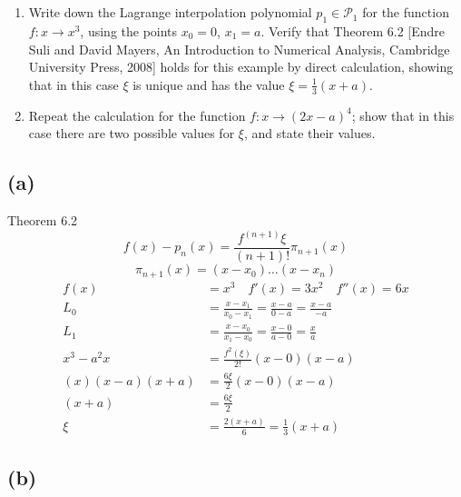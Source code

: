 \documentclass{article}
\begin{document}
\section{}
\begin{enumerate}[label = (\alph*)]
    \item Write down the Lagrange interpolation polynomial $p_1 \in \mathcal{P}_1$ for the function $f:x \to x^3$, using the points $x_0 = 0$, $x_1 = a$. Verify that Theorem 6.2 [Endre Suli and David Mayers, An Introduction to Numerical Analysis, Cambridge University Press, 2008] holds for this example by direct calculation, showing that in this case $\xi$ is unique and has the value $\xi=\frac{1}{3}(x+a)$.
    \item Repeat the calculation for the function $f: x \to (2x-a)^4$; show that in this case there are two possible values for $\xi$, and state their values.
\end{enumerate}
\vspace{10mm}

\subsection*{(a)}
Theorem 6.2
\begin{equation}\label{thm:6.2a}
    f(x) - p_n(x) = \frac{f^{(n+1)}\xi}{(n+1)!} \pi_{n+1}(x)
\end{equation}
\begin{equation}\label{thm:6.2b}
    \pi_{n+1}(x) = (x-x_0) \dots(x-x_n)
\end{equation}
\begin{align*}
    f(x) &= x^3 \quad f'(x)=3x^2 \quad f''(x) = 6x \\
    L_0 &=  \frac{x-x_1}{x_0 - x_1} = \frac{x-a}{0-a} =\frac{x-a}{-a}\\
    L_1 &=   \frac{x-x_0}{x_1 - x_0} = \frac{x-0}{a-0} =\frac{x}{a}\\
    x^3 - a^2x &= \frac{f^2(\xi)}{2!}(x-0)(x-a)\\
    (x)(x-a)(x+a) &= \frac{6 \xi}{2}(x-0)(x-a)\\
    (x+a) &= \frac{6 \xi}{2}\\
    \xi &= \frac{2(x+a)}{6} = \frac{1}{3}(x+a)
\end{align*}

\subsection*{(b)}
\end{document}

